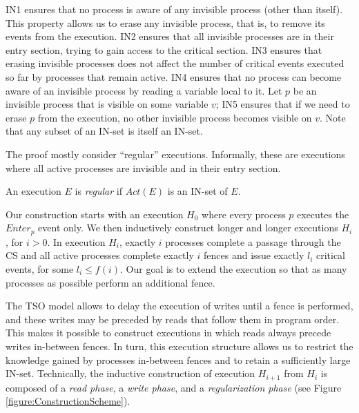 IN1 ensures that no process is aware of any invisible process (other than itself). This property allows us to erase any invisible process, that is, to remove its events from the execution. IN2 ensures that all invisible processes are in their entry section, trying to gain access to the critical section. IN3 ensures that erasing invisible processes does not affect the number of critical events executed so far by processes that remain active. IN4 ensures that no process can become aware of an invisible process by reading a variable local to it.
Let $p$ be an invisible process that is visible on some variable $v$; IN5 ensures that if we need to erase $p$ from the execution, no other invisible process becomes visible on $v$. Note that any subset of an IN-set is itself an IN-set.

The proof mostly consider ``regular'' executions. Informally, these are executions where all active processes are invisible and in their entry section.
	
\begin{definition} \label{defenition: regular-execution}
	An execution $E$ is \emph{regular} if $Act(E)$ is an IN-set of $E$.
\end{definition}

Our construction starts with an execution $H_0$ where every process $p$ executes the $Enter_p$ event only. We then inductively construct longer and longer executions $H_i$, for $i>0$. In execution $H_i$, exactly $i$ processes complete a passage through the CS and all active processes complete exactly $i$ fences and issue exactly $l_i$ critical events, for some $l_i \leq f(i)$. Our goal is to extend the execution so that as many processes as possible perform an additional fence.

The TSO model allows to delay the execution of writes until a fence is performed, and these writes may be preceded by reads that follow them in program order. This makes it possible to construct executions in which reads always precede writes in-between fences. In turn, this execution structure allows us to restrict the knowledge gained by processes in-between fences and to retain a sufficiently large IN-set. Technically, the inductive construction of  execution $H_{i+1}$ from $H_i$ is composed of a \emph{read phase}, a \emph{write phase}, and a \emph{regularization phase} (see Figure \ref{figure:ConstructionScheme}).


